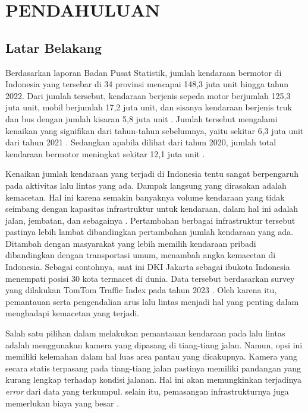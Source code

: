 \chapter{PENDAHULUAN}

\section{Latar Belakang}

Berdasarkan laporan Badan Pusat Statistik, jumlah kendaraan bermotor di Indonesia yang tersebar di 34 provinsi mencapai 148,3 juta unit hingga tahun 2022. Dari jumlah tersebut, kendaraan berjenis sepeda motor berjumlah 125,3 juta unit, mobil berjumlah 17,2 juta unit, dan sisanya kendaraan berjenis truk dan bus dengan jumlah kisaran 5,8 juta unit \cite{BPS2022}. Jumlah tersebut mengalami kenaikan yang signifikan dari tahun-tahun sebelumnya, yaitu sekitar 6,3 juta unit dari tahun 2021 \cite{BPS2021}. Sedangkan apabila dilihat dari tahun 2020, jumlah total kendaraan bermotor meningkat sekitar 12,1 juta unit \cite{BPS2020}.

Kenaikan jumlah kendaraan yang terjadi di Indonesia tentu sangat berpengaruh pada aktivitas lalu lintas yang ada. Dampak langsung yang dirasakan adalah kemacetan. Hal ini karena semakin banyaknya volume kendaraan yang tidak seimbang dengan kapasitas infrastruktur untuk kendaraan, dalam hal ini adalah jalan, jembatan, dan sebagainya \cite{jurnalMacetSBY}. Pertambahan berbagai infrastruktur tersebut pastinya lebih lambat dibandingkan pertambahan jumlah kendaraan yang ada. Ditambah dengan masyarakat yang lebih memilih kendaraan pribadi dibandingkan dengan transportasi umum, menambah angka kemacetan di Indonesia. Sebagai contohnya, saat ini DKI Jakarta sebagai ibukota Indonesia menempati posisi 30 kota termacet di dunia. Data tersebut berdasarkan survey yang dilakukan TomTom Traffic Index pada tahun 2023 \cite{tomtom}. Oleh karena itu, pemantauan serta pengendalian arus lalu lintas menjadi hal yang penting dalam menghadapi kemacetan yang terjadi.

Salah satu pilihan dalam melakukan pemantauan kendaraan pada lalu lintas adalah menggunakan kamera yang dipasang di tiang-tiang jalan. Namun, opsi ini memiliki kelemahan dalam hal luas area pantau yang dicakupnya. Kamera yang secara statis terpasang pada tiang-tiang jalan pastinya memiliki pandangan yang kurang lengkap terhadap kondisi jalanan. Hal ini akan memungkinkan terjadinya \emph{error} dari data yang terkumpul. selain itu, pemasangan infrastrukturnya juga memerlukan biaya yang besar \cite{GuptaSurveillanceDrone}.

